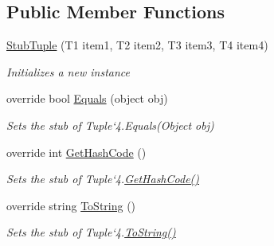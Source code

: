 \subsection*{Public Member Functions}
\begin{DoxyCompactItemize}
\item 
\hyperlink{class_system_1_1_fakes_1_1_stub_tuple_3_01_t1_00_01_t2_00_01_t3_00_01_t4_01_4_a29062573c99856837eb7b2feb57725fc}{Stub\-Tuple} (T1 item1, T2 item2, T3 item3, T4 item4)
\begin{DoxyCompactList}\small\item\em Initializes a new instance\end{DoxyCompactList}\item 
override bool \hyperlink{class_system_1_1_fakes_1_1_stub_tuple_3_01_t1_00_01_t2_00_01_t3_00_01_t4_01_4_a7dcd31dd9b31a2bed47148be7d256796}{Equals} (object obj)
\begin{DoxyCompactList}\small\item\em Sets the stub of Tuple`4.Equals(\-Object obj)\end{DoxyCompactList}\item 
override int \hyperlink{class_system_1_1_fakes_1_1_stub_tuple_3_01_t1_00_01_t2_00_01_t3_00_01_t4_01_4_ad744f3a9a2103626bc7c4d22136655a4}{Get\-Hash\-Code} ()
\begin{DoxyCompactList}\small\item\em Sets the stub of Tuple`4.\hyperlink{class_system_1_1_fakes_1_1_stub_tuple_3_01_t1_00_01_t2_00_01_t3_00_01_t4_01_4_ad744f3a9a2103626bc7c4d22136655a4}{Get\-Hash\-Code()}\end{DoxyCompactList}\item 
override string \hyperlink{class_system_1_1_fakes_1_1_stub_tuple_3_01_t1_00_01_t2_00_01_t3_00_01_t4_01_4_af47bd19056b77b15be4aef2156d44868}{To\-String} ()
\begin{DoxyCompactList}\small\item\em Sets the stub of Tuple`4.\hyperlink{class_system_1_1_fakes_1_1_stub_tuple_3_01_t1_00_01_t2_00_01_t3_00_01_t4_01_4_af47bd19056b77b15be4aef2156d44868}{To\-String()}\end{DoxyCompactList}\end{DoxyCompactItemize}
